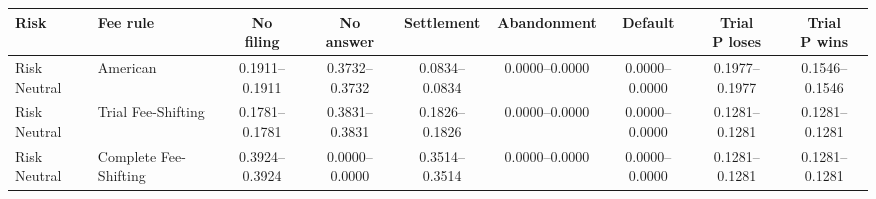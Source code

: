 \documentclass[10pt,border=5pt]{standalone}
\begin{document}
\begin{tabular}{llccccccc}
\toprule Risk & Fee rule & \shortstack{No\\filing} & \shortstack{No\\answer} & Settlement & Abandonment & Default & \shortstack{Trial\\P loses} & \shortstack{Trial\\P wins} \\
\midrule
Risk Neutral & American & 0.1911--0.1911 & 0.3732--0.3732 & 0.0834--0.0834 & 0.0000--0.0000 & 0.0000--0.0000 & 0.1977--0.1977 & 0.1546--0.1546 \\
Risk Neutral & Trial Fee-Shifting & 0.1781--0.1781 & 0.3831--0.3831 & 0.1826--0.1826 & 0.0000--0.0000 & 0.0000--0.0000 & 0.1281--0.1281 & 0.1281--0.1281 \\
Risk Neutral & Complete Fee-Shifting & 0.3924--0.3924 & 0.0000--0.0000 & 0.3514--0.3514 & 0.0000--0.0000 & 0.0000--0.0000 & 0.1281--0.1281 & 0.1281--0.1281 \\
\bottomrule\end{tabular}
\end{document}
